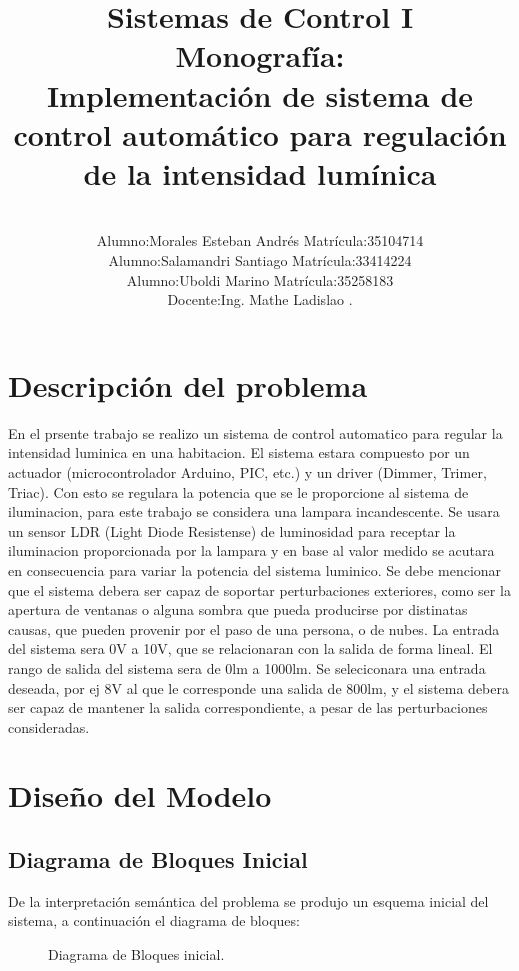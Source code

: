 \documentclass[a4paper,11pt]{article}
\title{Sistemas de Control I \\ Monografía: 
\\Implementación de sistema de control automático para regulación de la intensidad lumínica\\}
\author{\\Alumno:Morales Esteban Andrés Matrícula:35104714\\
	  Alumno:Salamandri Santiago Matrícula:33414224\\
	  Alumno:Uboldi Marino Matrícula:35258183\\
	  Docente:Ing. Mathe Ladislao			.}
\begin{document}
\maketitle
\newpage
\tableofcontents
\newpage
\section{Descripción del problema}
En el prsente trabajo se realizo un sistema de control automatico para regular la intensidad luminica en una habitacion. 
El sistema estara compuesto por un actuador (microcontrolador Arduino, PIC, etc.) y un driver (Dimmer, Trimer, Triac). Con esto se regulara la potencia que se le proporcione al sistema de iluminacion, para este trabajo se considera una lampara incandescente. Se usara un sensor LDR (Light Diode Resistense) de luminosidad para receptar la iluminacion proporcionada por la lampara y en base al valor medido se acutara en consecuencia para variar la potencia del sistema luminico. 
Se debe mencionar que el sistema debera ser capaz de soportar perturbaciones exteriores, como ser la apertura de ventanas o alguna sombra que pueda producirse por distinatas causas, que pueden provenir por el paso de una persona, o de nubes. 
La entrada del sistema sera 0V a 10V, que se relacionaran con la salida de forma lineal. El rango de salida del sistema sera de 0lm a 1000lm. Se seleciconara una entrada deseada, por ej 8V al que le corresponde una salida de 800lm, y el sistema debera ser capaz de mantener la salida correspondiente, a pesar de las perturbaciones consideradas.
\section{Diseño del Modelo}
  \subsection{Diagrama de Bloques Inicial}
  De la interpretación semántica del problema se produjo un esquema inicial del sistema, a continuación el diagrama de bloques:
  \begin{figure}[H] %
	\caption{Diagrama de Bloques inicial.}
	\label{fig:diagrama1}
	\end{figure} 
\end{document}
